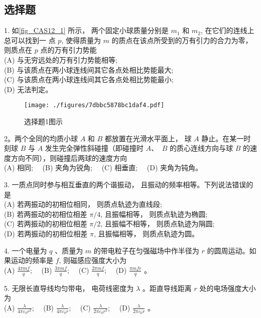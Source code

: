 \subsection{选择题}
1. 如\autoref{fig_CAS12_1} 所示， 两个固定小球质量分别是 $m_{1}$ 和 $m_{2}$, 在它们的连线上总可以找到一
点 $p$, 使得质量为 $m$ 的质点在该点所受到的万有引力的合力为零， 则质点在 $p$
点的万有引力势能\\
(A) 与无穷远处的万有引力势能相等;\\
(B) 与该质点在两小球连线间其它各点处相比势能最大;\\
(C) 与该质点在两小球连线间其它各点处相比势能最小;\\
(D) 无法判定。
\begin{figure}[ht]
\centering
\texttt{[image: ./figures/7dbbc5878bc1daf4.pdf]}
\caption{选择题1图示} \label{fig_CAS12_1}
\end{figure}
2。两个全同的均质小球 ${A}$ 和 ${B}$ 都放置在光滑水平面上， 球 ${A}$ 静止。在某一时刻球 ${B}$ 与 ${A}$ 发生完全弹性斜碰撞（即碰撞时 ${A}$、 ${~B}$ 的质心连线方向与球 ${B}$ 的速度方向不同），则碰撞后两球的速度方向\\
(A) 相同;$\quad$
(B) 夹角为锐角;$\quad$
(C) 相垂直;$\quad$
(D) 夹角为钝角。

3. 一质点同时参与相互垂直的两个谐振动， 且振动的频率相等。下列说法错误的是\\
(A) 若两振动的初相位相同， 则质点轨迹为直线段;\\
(B) 若两振动的初相位相差 $\pi / 4$, 且振幅相等， 则质点轨迹为椭圆;\\
(C) 若两振动的初相位相差 $\pi / 2$, 且振幅不相等， 则质点轨迹为䧎圆;\\
(D) 若两振动的初相位相差 $\pi$, 且振幅相等， 则质点轨迹为圆。

4. 一个电量为 $q$ 、质量为 $m$ 的带电粒子在匀强磁场中作半径为 $r$ 的圆周运动。如果运动的频率是 $f$, 则磁感应强度大小为\\
(A) $\frac{4 \pi m f}{q}$;$\quad$
(B) $\frac{3 \pi m f}{q}$;$\quad$
(C) $\frac{2 \pi m f}{q}$;$\quad$
(D) $\frac{\pi m f r}{q}$ 。

5. 无限长直导线均匀带电， 电荷线密度为 $\lambda$ 。距直导线距离 $r$ 处的电场强度大小为\\
(A) $\frac{\lambda}{4 \pi \varepsilon_{0} r^{2}}$;$\quad$
(B) $\frac{\lambda}{4 \pi \varepsilon_{0} r}$;$\quad$
(C) $\frac{\lambda}{2 \pi \varepsilon_{0} r^{2}}$;$\quad$
(D) $\frac{\lambda}{2 \pi \varepsilon_{0} r}$ 。

